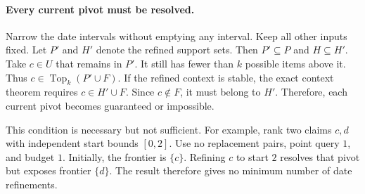 \paragraph{Every current pivot must be resolved.}
Narrow the date intervals without emptying any interval.
Keep all other inputs fixed.
Let $P'$ and $H'$ denote the refined support sets.
Then $P'\subseteq P$ and $H\subseteq H'$.
Take $c\in U$ that remains in $P'$.
It still has fewer than $k$ possible items above it.
Thus $c\in\operatorname{Top}_k(P'\cup F)$.
If the refined context is stable, the exact context theorem requires $c\in H'\cup F$.
Since $c\notin F$, it must belong to $H'$.
Therefore, each current pivot becomes guaranteed or impossible.

This condition is necessary but not sufficient.
For example, rank two claims $c,d$ with independent start bounds $[0,2]$.
Use no replacement pairs, point query $1$, and budget $1$.
Initially, the frontier is $\{c\}$.
Refining $c$ to start $2$ resolves that pivot but exposes frontier $\{d\}$.
The result therefore gives no minimum number of date refinements.

